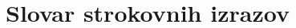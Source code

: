 \documentclass[12pt,a4paper]{amsart}
\theoremstyle{definition} %
\theoremstyle{plain} %
\newcommand{\geslo}[2]{\noindent\textbf{#1}\hspace*{3mm}\hangindent=\parindent\hangafter=1 #2}
\begin{document}
\section*{Slovar strokovnih izrazov}

%
%


\begin{thebibliography}{99}


\end{thebibliography}
\end{document}
